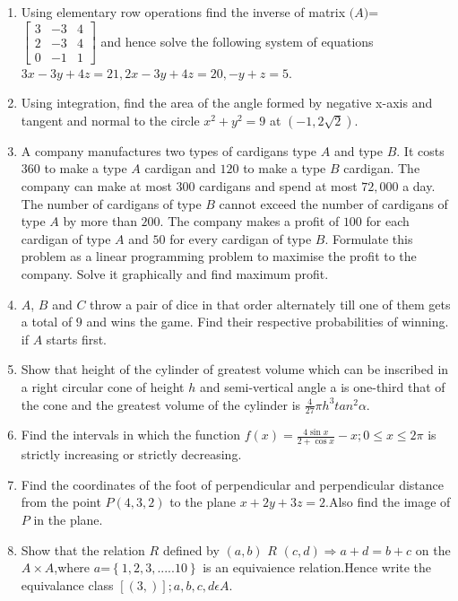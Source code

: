 \documentclass[12pt,-letter paper]{article}
\let\vec\mathbf{}
\let\vec\mathbf{}
\let\vec\mathbf{}
\providecommand{\myvec}[1]{\ensuremath{\begin{bmatrix}#1\end{bmatrix}}}
\providecommand{\cbrak}[1]{\ensuremath{\left\{#1\right\}}}
\providecommand{\brak}[1]{\ensuremath{\left(#1\right)}}
\begin{document}
\begin{enumerate}
\item Using elementary row operations find the inverse of matrix $\vec(A)$=$\myvec{3 & -3 & 4 \\ 2 & -3 & 4 \\ 0 & -1 & 1}$ and hence solve the following system of equations $3x-3y+4z=21,2x-3y+4z=20,-y+z=5$.
\item Using integration, find the area of the angle formed by negative x-axis and tangent and normal to the circle $x^2+y^2=9$ at $\brak{-1,2\sqrt{2}}$.
\item A company manufactures two types of cardigans type $A$ and type $B$. It costs \rupee$360$ to make a type $A$ cardigan and \rupee$120$ to make a type $B$ cardigan. The company can make at most $300$ cardigans and spend at most \rupee$72,000$ a day. The number of cardigans of type $B$ cannot exceed the number of cardigans of type $A$ by more than $200$. The company makes a profit of \rupee$100$ for each cardigan of type $A$ and \rupee$50$ for every cardigan of type $B$.
Formulate this problem as a linear programming problem to maximise the profit to the company. Solve it graphically and find maximum profit.
\item $A$, $B$ and $C$ throw a pair of dice in that order alternately till one of them gets a total of $9$ and wins the game. Find their respective probabilities of winning. if $A$ starts first.
\item Show that height of the cylinder of greatest volume which can be inscribed in a right circular cone of height $h$ and semi-vertical angle a is one-third that of the cone and the greatest volume of the cylinder is $\frac{4}{27}\pi h^3 tan^2{\alpha}$.
\item Find the intervals in which the function $f\brak{x}=\frac{4\sin{x}}{2+\cos{x}}-x; 0\leq x \leq 2\pi$ is strictly increasing or strictly decreasing.
\item Find the coordinates of the foot of perpendicular and perpendicular distance from the point $P\brak{4 , 3 , 2 }$ to the plane $x+2y+3z=2$.Also find the image of $P$ in the plane.
\item Show that the relation $R$ defined by $\brak{a,b}$ $R$ $\brak{c,d} \Rightarrow a+d=b+c$ on the $A\times A$,where $a$=$\cbrak{1,2,3,.....10}$ is an equivaience relation.Hence write the equivalance class $[\brak{3,}] ;a,b,c,d \epsilon A$.


\end{enumerate}
\end{document}
